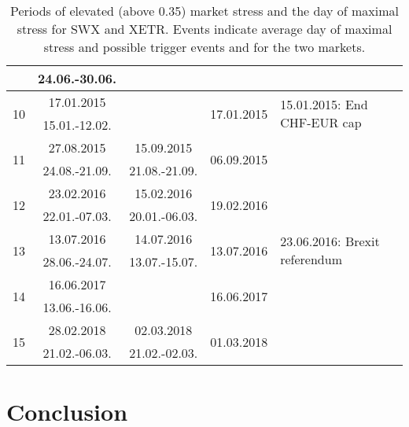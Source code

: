 \documentclass[11pt,twoside,a4paper]{article}
\begin{document}
\begin{table}
\begin{tabular}{c|c|c|c|l}
							 & 24.06.-30.06.	& & &\\
\hline
\multirow{2}{*}{10} & 17.01.2015 		& & \multirow{2}{*}{17.01.2015} & \multirow{2}{0.33\linewidth}{15.01.2015: End CHF-EUR cap}\\
							 & 15.01.-12.02.	& & &\\
\hline
\multirow{2}{*}{11} & 27.08.2015 		& 15.09.2015     & \multirow{2}{*}{06.09.2015} & \multirow{2}{0.33\linewidth}{}\\
							 & 24.08.-21.09.	& 21.08.-21.09. & &\\
\hline
\multirow{2}{*}{12} & 23.02.2016 		& 15.02.2016     & \multirow{2}{*}{19.02.2016} & \multirow{2}{0.33\linewidth}{}\\
							 & 22.01.-07.03.	& 20.01.-06.03. & &\\
\hline
\multirow{2}{*}{13} & 13.07.2016 		& 14.07.2016     & \multirow{2}{*}{13.07.2016} & \multirow{2}{0.33\linewidth}{23.06.2016: Brexit referendum}\\
							 & 28.06.-24.07.	& 13.07.-15.07. & &\\
\hline
\multirow{2}{*}{14} & 16.06.2017 		& & \multirow{2}{*}{16.06.2017} & \multirow{2}{0.33\linewidth}{}\\
							 & 13.06.-16.06.	& & &\\
\hline
\multirow{2}{*}{15} & 28.02.2018 		& 02.03.2018     & \multirow{2}{*}{01.03.2018} & \multirow{2}{0.33\linewidth}{}\\
							 & 21.02.-06.03.	& 21.02.-02.03. & &\\
\hline
\end{tabular}
\caption{Periods of elevated (above 0.35) market stress and the day of maximal stress for SWX and XETR. Events indicate average day of maximal stress and possible trigger events and  for the two markets.}
\label{tab_marketevents}
\end{table}
\FloatBarrier
\section{Conclusion}

{}

\end{document}
